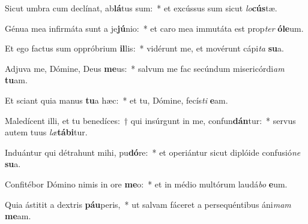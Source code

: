 \item Sicut umbra cum declínat, ab\textbf{lá}tus sum:~* et excússus sum sicut \textit{lo}\textbf{cús}tæ.
\item Génua mea infirmáta sunt a je\textbf{jú}nio:~* et caro mea immutáta est prop\textit{ter} \textbf{ó}\textbf{le}um.
\item Et ego factus sum oppróbrium \textbf{il}lis:~* vidérunt me, et movérunt cápi\textit{ta} \textbf{su}a.
\item Adjuva me, Dómine, Deus \textbf{me}us:~* salvum me fac secúndum misericórdi\textit{am} \textbf{tu}am.
\item Et sciant quia manus \textbf{tu}a hæc:~* et tu, Dómine, fecís\textit{ti} \textbf{e}am.
\item Maledícent illi, et tu benedíces:~† qui insúrgunt in me, confun\textbf{dán}tur:~* servus autem tuus \textit{læ}\textbf{tá}\textbf{bi}tur.
\item Induántur qui détrahunt mihi, pu\textbf{dó}re:~* et operiántur sicut diplóide confusió\textit{ne} \textbf{su}a.
\item Confitébor Dómino nimis in ore \textbf{me}o:~* et in médio multórum laudá\textit{bo} \textbf{e}um.
\item Quia ástitit a dextris \textbf{páu}peris,~* ut salvam fáceret a persequéntibus áni\textit{mam} \textbf{me}am.
